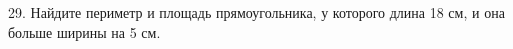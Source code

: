 29. Найдите периметр и площадь прямоугольника, у которого длина 18 см, и она больше ширины на 5 см.\\
